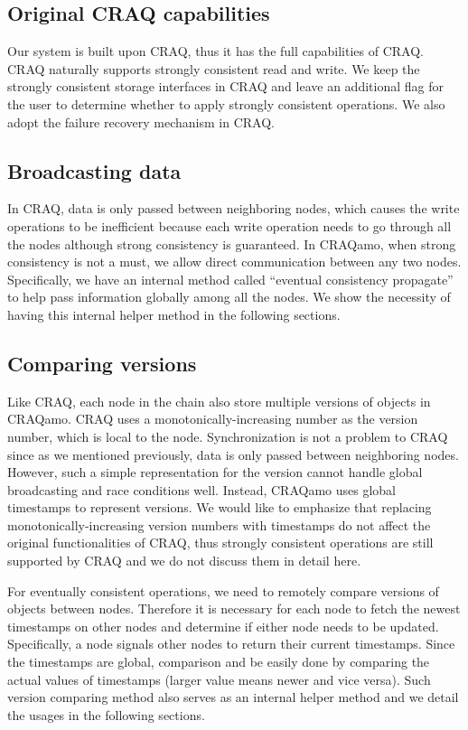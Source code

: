 \subsection{Original CRAQ capabilities}
Our system is built upon CRAQ, thus it has the full capabilities of CRAQ. CRAQ naturally supports strongly consistent read and write. We keep the strongly consistent storage interfaces in CRAQ and leave an additional flag for the user to determine whether to apply strongly consistent operations. We also adopt the failure recovery mechanism in CRAQ.

\subsection{Broadcasting data}
In CRAQ, data is only passed between neighboring nodes, which causes the write operations to be inefficient because each write operation needs to go through all the nodes although strong consistency is guaranteed. In CRAQamo, when strong consistency is not a must, we allow direct communication between any two nodes. Specifically, we have an internal method called ``eventual consistency propagate'' to help pass information globally among all the nodes. We show the necessity of having this internal helper method in the following sections.

\subsection{Comparing versions}
Like CRAQ, each node in the chain also store multiple versions of objects in CRAQamo. CRAQ uses a monotonically-increasing number as the version number, which is local to the node. Synchronization is not a problem to CRAQ since as we mentioned previously, data is only passed between neighboring nodes. However, such a simple representation for the version cannot handle global broadcasting and race conditions well. Instead, CRAQamo uses global timestamps to represent versions. We would like to emphasize that replacing monotonically-increasing version numbers with timestamps do not affect the original functionalities of CRAQ, thus strongly consistent operations are still supported by CRAQ and we do not discuss them in detail here.

For eventually consistent operations, we need to remotely compare versions of objects between nodes. Therefore it is necessary for each node to fetch the newest timestamps on other nodes and determine if either node needs to be updated. Specifically, a node signals other nodes to return their current timestamps. Since the timestamps are global, comparison and be easily done by comparing the actual values of timestamps (larger value means newer and vice versa). Such version comparing method also serves as an internal helper method and we detail the usages in the following sections. 

